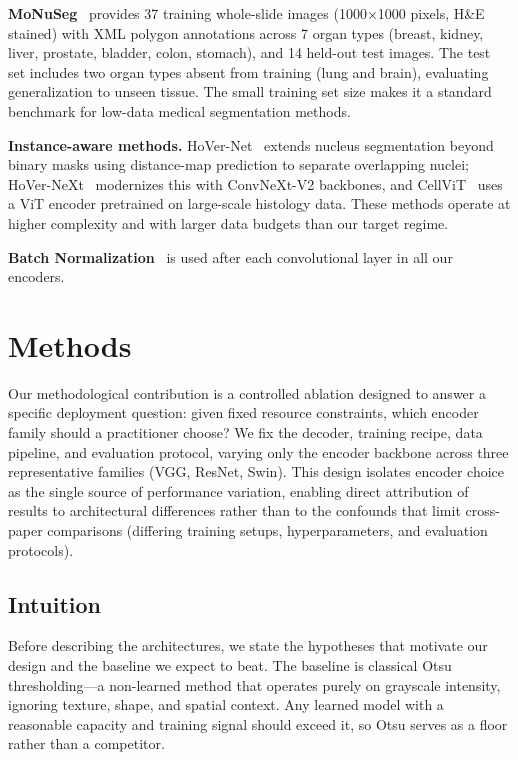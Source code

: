 \documentclass{article}
\begin{document}
\textbf{MoNuSeg}~\cite{kumar2017monuseg} provides 37 training whole-slide images (1000$\times$1000 pixels, H\&E stained) with XML polygon annotations across 7 organ types (breast, kidney, liver, prostate, bladder, colon, stomach), and 14 held-out test images. The test set includes two organ types absent from training (lung and brain), evaluating generalization to unseen tissue. The small training set size makes it a standard benchmark for low-data medical segmentation methods.

\textbf{Instance-aware methods.} HoVer-Net~\cite{graham2019hovernet} extends nucleus segmentation beyond binary masks using distance-map prediction to separate overlapping nuclei; HoVer-NeXt~\cite{hoverneXt2023} modernizes this with ConvNeXt-V2 backbones, and CellViT~\cite{cellvit2023} uses a ViT encoder pretrained on large-scale histology data. These methods operate at higher complexity and with larger data budgets than our target regime.

\textbf{Batch Normalization}~\cite{ioffe2015batchnorm} is used after each convolutional layer in all our encoders.

\section{Methods}

Our methodological contribution is a controlled ablation designed to answer a specific deployment question: given fixed resource constraints, which encoder family should a practitioner choose? We fix the decoder, training recipe, data pipeline, and evaluation protocol, varying only the encoder backbone across three representative families (VGG, ResNet, Swin). This design isolates encoder choice as the single source of performance variation, enabling direct attribution of results to architectural differences rather than to the confounds that limit cross-paper comparisons (differing training setups, hyperparameters, and evaluation protocols).

\subsection{Intuition}
\label{sec:intuition}

Before describing the architectures, we state the hypotheses that motivate our design and the baseline we expect to beat. The baseline is classical Otsu thresholding---a non-learned method that operates purely on grayscale intensity, ignoring texture, shape, and spatial context. Any learned model with a reasonable capacity and training signal should exceed it, so Otsu serves as a floor rather than a competitor.
\end{document}
